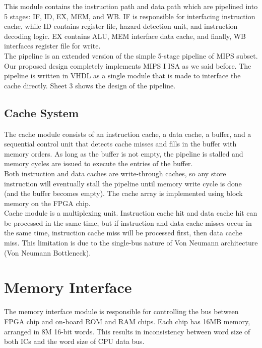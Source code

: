 \documentclass[]{scrartcl}
\begin{document}
This module contains the instruction path and data path which are pipelined
into 5 stages: IF, ID, EX, MEM, and WB. IF is responsible for interfacing
instruction cache, while ID contains register file, hazard detection unit,
and instruction decoding logic. EX contains ALU, MEM interface data cache,
and finally, WB interfaces register file for write.\\

The pipeline is an extended version of the simple 5-stage pipeline of MIPS
subset. Our proposed design completely implements MIPS I ISA as we said
before. The pipeline is written in VHDL as a single module that is made
to interface the cache directly. Sheet 3 shows the design of the pipeline.

\subsection{Cache System}

The cache module consists of an instruction cache, a data cache, a buffer,
and a sequential control unit that detects cache misses and fills in the buffer
with memory orders. As long as the buffer is not empty, the pipeline is
stalled and memory cycles are issued to execute the entries of the buffer.\\

Both instruction and data caches are write-through caches, so any store
instruction will eventually stall the pipeline until memory write
cycle is done (and the buffer becomes empty). The cache array is
implemented using block memory on the FPGA chip.\\

Cache module is a multiplexing unit. Instruction cache hit and data cache hit
can be processed in the same time, but if instruction and data cache misses
occur in the same time, instruction cache miss will be processed first, then
data cache miss. This limitation is due to the single-bus nature of Von Neumann
architecture (Von Neumann Bottleneck).

\section{Memory Interface}

The memory interface module is responsible for controlling the bus between
FPGA chip and on-board ROM and RAM chips. Each chip has 16MB memory, arranged
in 8M 16-bit words. This results in inconsistency between word size of both ICs
and the word size of CPU data bus.\\
\end{document}
